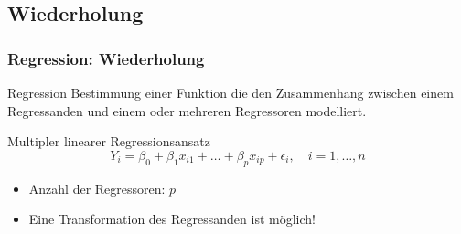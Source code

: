 \documentclass{beamer}
\begin{document}
\subsection{Wiederholung}
\begin{frame}
  \frametitle{Regression: Wiederholung}

  \begin{block}{Regression}
    Bestimmung einer Funktion die den Zusammenhang zwischen einem Regressanden und einem oder mehreren Regressoren modelliert.
  \end{block}
  
  \pause

  \begin{block}{Multipler linearer Regressionsansatz}
    \begin{equation*}
      Y_i = \beta_0 + \beta_1 x_{i1} + \dots + \beta_p x_{ip} + \epsilon_i, \quad i = 1, \dots, n
    \end{equation*}
    \begin{itemize}
    \item Anzahl der Regressoren: $p$
    \end{itemize}
  \end{block}

  \begin{itemize}
  \item Eine Transformation des Regressanden ist möglich!
  \end{itemize}

\end{frame}
\end{document}
